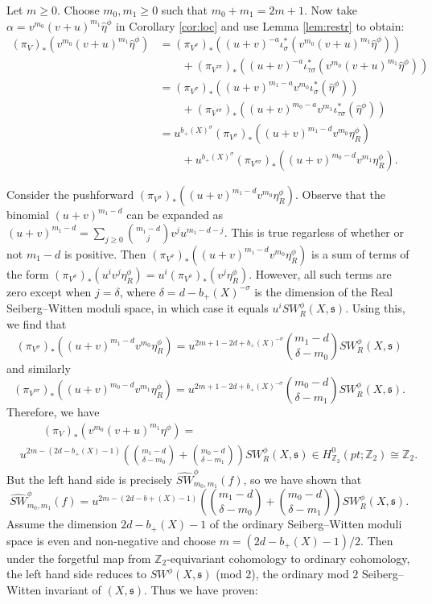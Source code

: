 \documentclass{amsart}
\theoremstyle{definition}
\theoremstyle{remark}
\numberwithin{equation}{section}
\begin{document}
Let $m \ge 0$. Choose $m_0,m_1 \ge 0$ such that $m_0 + m_1 = 2m+1$. Now take $\alpha = v^{m_0}(v+u)^{m_1} \widehat{\eta}^\phi$ in Corollary \ref{cor:loc} and use Lemma \ref{lem:restr} to obtain:
\begin{align*}
(\pi_V)_*( v^{m_0}(v+u)^{m_1} \widehat{\eta}^\phi ) &= (\pi_{V^\sigma})_*( (u+v)^{-a}\iota_{\sigma}^*( v^{m_0} (v+u)^{m_1} \widehat{\eta}^\phi ) ) \\
& \quad \quad + (\pi_{V^{\tau \sigma}})_*( (u+v)^{-a} \iota_{\tau \sigma}^*( v^{m_0} (v+u)^{m_1} \widehat{\eta}^\phi ) ) \\
&= (\pi_{V^\sigma})_*( (u+v)^{m_1-a} v^{m_0} \iota_{\sigma}^*(\widehat{\eta}^\phi) ) \\
& \quad \quad + (\pi_{V^{\tau \sigma}})_*( (u+v)^{m_0-a} v^{m_1} \iota_{\tau \sigma}^*(\widehat{\eta}^\phi) ) \\
&= u^{b_+(X)^\sigma} (\pi_{V^\sigma})_*( (u+v)^{m_1 - d} v^{m_0} \eta^\phi_R) \\
& \quad \quad + u^{b_+(X)^\sigma} (\pi_{V^{\tau \sigma}})_*( (u+v)^{m_0-d} v^{m_1} \eta^\phi_R).
\end{align*}

Consider the pushforward $(\pi_{V^{\sigma}})_*( (u+v)^{m_1 - d} v^{m_0} \eta^\phi_R)$. Observe that the binomial $(u+v)^{m_1-d}$ can be expanded as $(u+v)^{m_1-d} = \sum_{j \ge 0} \binom{m_1-d}{j} v^j u^{m_1-d-j}$. This is true regarless of whether or not $m_1-d$ is positive. Then $(\pi_{V^{\sigma}})_*( (u+v)^{m_1 - d} v^{m_0} \eta^\phi_R)$ is a sum of terms of the form $(\pi_{V^{\sigma}})_*( u^i v^j \eta^\phi_R) = u^i (\pi_{V^{\sigma}})_*( v^j \eta^\phi_R)$. However, all such terms are zero except when $j = \delta$, where $\delta = d - b_+(X)^{-\sigma}$ is the dimension of the Real Seiberg--Witten moduli space, in which case it equals $u^i SW^\phi_R(X,\mathfrak{s})$. Using this, we find that
\[
(\pi_{V^{\sigma}})_*( (u+v)^{m_1 - d} v^{m_0} \eta^\phi_R) = u^{2m+1-2d+b_+(X)^{-\sigma}} \binom{m_1 - d}{\delta - m_0} SW^\phi_R(X,\mathfrak{s})
\]
and similarly
\[
(\pi_{V^{\tau\sigma}})_*( (u+v)^{m_0 - d} v^{m_1} \eta^\phi_R) = u^{2m+1-2d+b_+(X)^{-\sigma}} \binom{m_0 - d}{\delta - m_1} SW^\phi_R(X,\mathfrak{s}).
\]
Therefore, we have
\begin{align*}
& \quad \quad (\pi_V)_*( v^{m_0}(v+u)^{m_1} \eta^\phi ) = \\
& u^{2m - (2d-b_+(X)-1)}\left( \binom{m_1-d}{\delta-m_0} + \binom{m_0-d}{\delta-m_1} \right) SW^\phi_R(X,\mathfrak{s}) \in H^0_{\mathbb{Z}_2}(pt ; \mathbb{Z}_2) \cong \mathbb{Z}_2.
\end{align*}
But the left hand side is precisely $\widehat{SW}^\phi_{m_0,m_1}(f)$, so we have shown that
\[
\widehat{SW}^\phi_{m_0,m_1}(f) = u^{2m-(2d-b+(X)-1)}\left( \binom{m_1-d}{\delta-m_0} + \binom{m_0-d}{\delta-m_1} \right) SW^\phi_R(X,\mathfrak{s}).
\]
Assume the dimension $2d - b_+(X) - 1$ of the ordinary Seiberg--Witten moduli space is even and non-negative and choose $m = (2d-b_+(X)-1)/2$. Then under the forgetful map from $\mathbb{Z}_2$-equivariant cohomology to ordinary cohomology, the left hand side reduces to $SW^\phi(X,\mathfrak{s})$ (mod $2$), the ordinary mod $2$ Seiberg--Witten invariant of $(X,\mathfrak{s})$. Thus we have proven:
\end{document}
